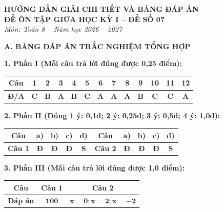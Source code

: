 \documentclass[12pt,a4paper]{article}
\begin{document}
\begin{center}
  \textbf{\Large HƯỚNG DẪN GIẢI CHI TIẾT VÀ BẢNG ĐÁP ÁN}\\
  \textbf{\large ĐỀ ÔN TẬP GIỮA HỌC KỲ I -- ĐỀ SỐ 07}\\
  \textit{Môn: Toán 8 -- Năm học 2026 -- 2027}
\end{center}
\vspace{2mm}

\noindent\textbf{\large A. BẢNG ĐÁP ÁN TRẮC NGHIỆM TỔNG HỢP}
\vspace{1mm}

\noindent\textbf{1. Phần I (Mỗi câu trả lời đúng được 0,25 điểm):}
\begin{center}
\begin{tabular}{|c|c|c|c|c|c|c|c|c|c|c|c|c|}
\hline
\textbf{Câu} & \textbf{1} & \textbf{2} & \textbf{3} & \textbf{4} & \textbf{5} & \textbf{6} & \textbf{7} & \textbf{8} & \textbf{9} & \textbf{10} & \textbf{11} & \textbf{12} \\
\hline
\textbf{Đ/A} & \textbf{C} & \textbf{B} & \textbf{A} & \textbf{B} & \textbf{C} & \textbf{A} & \textbf{A} & \textbf{A} & \textbf{B} & \textbf{C} & \textbf{C} & \textbf{A} \\
\hline
\end{tabular}
\end{center}
\vspace{0.5mm}

\noindent\textbf{2. Phần II (Đúng 1 ý: 0,1đ; 2 ý: 0,25đ; 3 ý: 0,5đ; 4 ý: 1,0đ):}
\begin{center}
\begin{tabular}{|c|c|c|c|c||c|c|c|c|c|}
\hline
\textbf{Câu} & \textbf{a)} & \textbf{b)} & \textbf{c)} & \textbf{d)} & \textbf{Câu} & \textbf{a)} & \textbf{b)} & \textbf{c)} & \textbf{d)} \\
\hline
\textbf{Câu 1} & \textbf{Đ} & \textbf{Đ} & \textbf{Đ} & \textbf{S} & \textbf{Câu 2} & \textbf{Đ} & \textbf{Đ} & \textbf{Đ} & \textbf{S} \\
\hline
\end{tabular}
\end{center}
\vspace{0.5mm}

\noindent\textbf{3. Phần III (Mỗi câu trả lời đúng được 1,0 điểm):}
\begin{center}
\begin{tabular}{|c|c|c|}
\hline
\textbf{Câu} & \textbf{Câu 1} & \textbf{Câu 2} \\
\hline
\textbf{Đáp án} & $\mathbf{100}$ & $\mathbf{x = 0; x = 2; x = -2}$ \\
\hline
\end{tabular}
\end{center}
\vspace{1.5mm}
\end{document}
